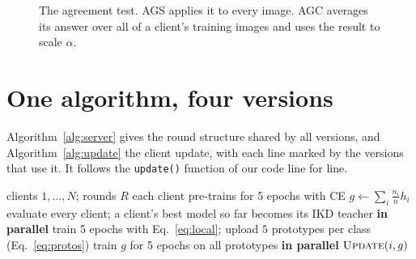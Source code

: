 \begin{figure}[t]
\centering
{}
\caption[The agreement test used by AGC and AGS]{The agreement test. AGS applies it to every image. AGC averages its answer over all of a client's training images and uses the result to scale $\alpha$.}
\label{fig:gate}
\end{figure}

\section{One algorithm, four versions}
\label{sec:m-alg}

Algorithm~\ref{alg:server} gives the round structure shared by all versions, and Algorithm~\ref{alg:update} the client update, with each line marked by the versions that use it. It follows the \texttt{update()} function of our code line for line.

\begin{algorithm}[H]
\caption{Fed-GDBD round structure (server side)}
\label{alg:server}
\begin{algorithmic}[1]
\Require clients $1,\dots,N$; rounds $R$
\State each client pre-trains for 5 epochs with CE
\State $g \gets \sum_i \frac{n_i}{n} h_i$ 
  \State evaluate every client; a client's best model so far becomes its IKD teacher
   \textbf{in parallel}
    \State train 5 epochs with Eq.~\ref{eq:local}; upload $5$ prototypes per class (Eq.~\ref{eq:protos})
  \EndFor
  \State train $g$ for 5 epochs on all prototypes 
   \textbf{in parallel}
    \State $\textsc{Update}(i, g)$ 
  \EndFor
\EndFor
\end{algorithmic}
\end{algorithm}

